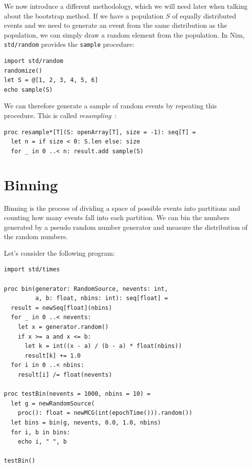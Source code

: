 \documentclass[justified, sixbynine]{tufte-book}
\def\ft{\small\tt}
\theoremstyle{plain}%
\newtheorem * {corollary}{Corollary}
\theoremstyle{definition}
\theoremstyle{remark}
\newtheorem * {remark}{Remark}
\newtheorem * {note}{Note}
\begin{document}
\begin{fullwidth}
We now introduce a different methodology, which we will need later when talking about the bootstrap method.
If we have a population $S$ of equally distributed events and we need to generate an event from the same distribution as the population, we can simply draw a random element from the population. In Nim, {\ft std/random} provides the {\ft sample} procedure:

\begin{lstlisting}
import std/random
randomize()
let S = @[1, 2, 3, 4, 5, 6]
echo sample(S)
\end{lstlisting}

We can therefore generate a sample of random events by repeating this procedure. This is called {\it resampling}~\cite{resampling}:

\begin{lstlisting}[caption={in file: {\ft nlib/randomgen.nim}}]
proc resample*[T](S: openArray[T], size = -1): seq[T] =
  let n = if size < 0: S.len else: size
  for _ in 0 ..< n: result.add sample(S)
\end{lstlisting}

\goodbreak\section{Binning}

Binning is the process of dividing a space of possible events into
partitions and counting how many events fall into each partition. We can bin
the numbers generated by a pseudo random number generator and measure the
distribution of the random numbers.

Let's consider the following program:
\begin{lstlisting}
import std/times

proc bin(generator: RandomSource, nevents: int,
         a, b: float, nbins: int): seq[float] =
  result = newSeq[float](nbins)
  for _ in 0 ..< nevents:
    let x = generator.random()
    if x >= a and x <= b:
      let k = int((x - a) / (b - a) * float(nbins))
      result[k] += 1.0
  for i in 0 ..< nbins:
    result[i] /= float(nevents)

proc testBin(nevents = 1000, nbins = 10) =
  let g = newRandomSource(
    proc(): float = newMCG(int(epochTime())).random())
  let bins = bin(g, nevents, 0.0, 1.0, nbins)
  for i, b in bins:
    echo i, " ", b

testBin()
\end{lstlisting}


\end{fullwidth}
\end{document}
